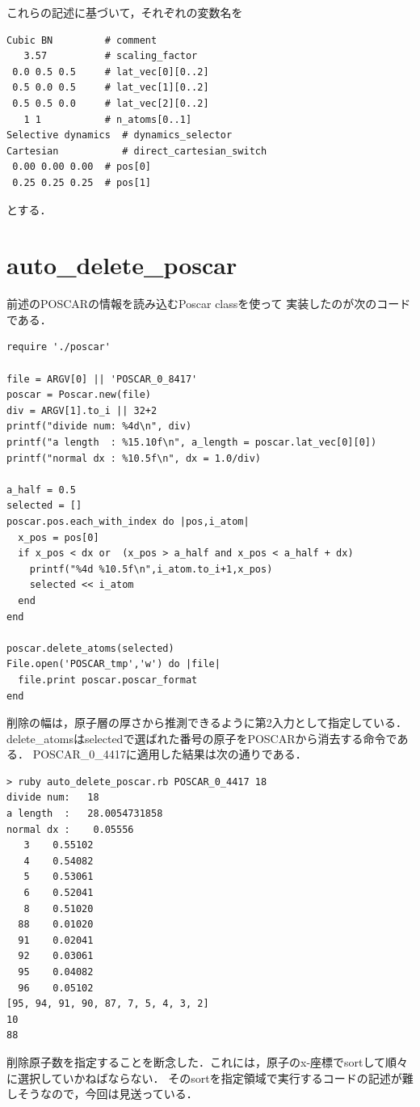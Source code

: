これらの記述に基づいて，それぞれの変数名を

\begin{verbatim}
Cubic BN         # comment
   3.57          # scaling_factor
 0.0 0.5 0.5     # lat_vec[0][0..2]
 0.5 0.0 0.5     # lat_vec[1][0..2]
 0.5 0.5 0.0     # lat_vec[2][0..2]
   1 1           # n_atoms[0..1]
Selective dynamics  # dynamics_selector
Cartesian           # direct_cartesian_switch
 0.00 0.00 0.00  # pos[0]
 0.25 0.25 0.25  # pos[1]
\end{verbatim}

とする．

    \section{auto\_delete\_poscar}\label{auto_delete_poscar}

前述のPOSCARの情報を読み込むPoscar classを使って
実装したのが次のコードである．

\begin{verbatim}
require './poscar'

file = ARGV[0] || 'POSCAR_0_8417'
poscar = Poscar.new(file)
div = ARGV[1].to_i || 32+2
printf("divide num: %4d\n", div)
printf("a length  : %15.10f\n", a_length = poscar.lat_vec[0][0])
printf("normal dx : %10.5f\n", dx = 1.0/div)

a_half = 0.5
selected = []
poscar.pos.each_with_index do |pos,i_atom|
  x_pos = pos[0]
  if x_pos < dx or  (x_pos > a_half and x_pos < a_half + dx)
    printf("%4d %10.5f\n",i_atom.to_i+1,x_pos)
    selected << i_atom
  end
end

poscar.delete_atoms(selected)
File.open('POSCAR_tmp','w') do |file|
  file.print poscar.poscar_format
end
\end{verbatim}

削除の幅は，原子層の厚さから推測できるように第2入力として指定している．
delete\_atomsはselectedで選ばれた番号の原子をPOSCARから消去する命令である．
POSCAR\_0\_4417に適用した結果は次の通りである．

\begin{verbatim}
> ruby auto_delete_poscar.rb POSCAR_0_4417 18
divide num:   18
a length  :   28.0054731858
normal dx :    0.05556
   3    0.55102
   4    0.54082
   5    0.53061
   6    0.52041
   8    0.51020
  88    0.01020
  91    0.02041
  92    0.03061
  95    0.04082
  96    0.05102
[95, 94, 91, 90, 87, 7, 5, 4, 3, 2]
10
88
\end{verbatim}

削除原子数を指定することを断念した．これには，原子のx-座標でsortして順々に選択していかねばならない．
そのsortを指定領域で実行するコードの記述が難しそうなので，今回は見送っている．

    